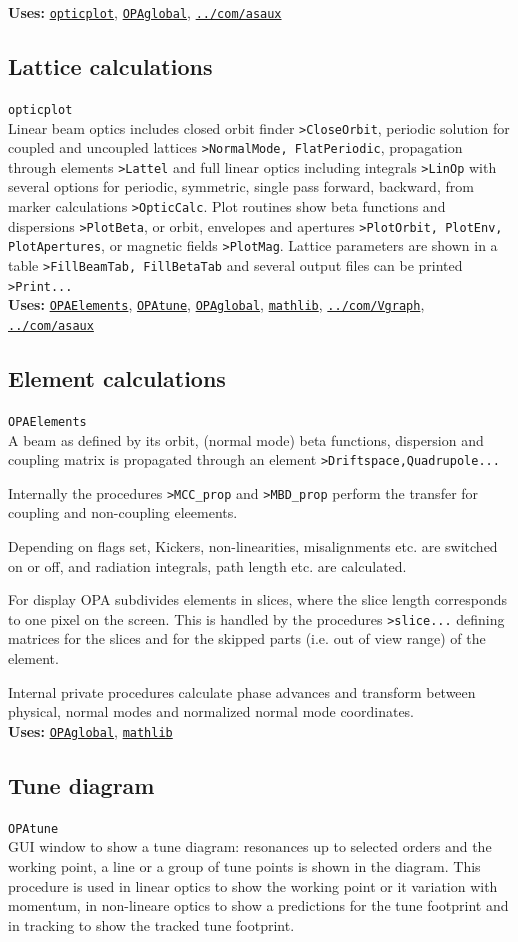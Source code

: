 \documentclass[12pt]{article}
\newcommand\code[1]{{\tt #1}}
\newcommand{\opagui}[1]{\colorbox{blue!20}{\code{#1}}}
\newcommand{\oguih}[2]{\subsection{\label{#2}#1}{\Huge\opagui{#2}}\\}
\newcommand{\ogui}[1]{\hyperref[#1]{\opagui{#1}}}
\newcommand{\opaguif}[1]{\colorbox{violet!30}{\code{#1}}}
\newcommand{\oguif}[1]{\hyperref[#1]{\opaguif{#1}}}
\newcommand{\opauni}[1]{\colorbox{orange!30}{\code{#1}}}
\newcommand{\ounih}[2]{\subsection{\label{#2}#1}{\Huge\opauni{#2}}\\}
\newcommand{\ouni}[1]{\hyperref[#1]{\opauni{#1}}}
\newcommand{\uses}[1]{{\bf Uses: } #1}
\begin{document}
\uses{\ouni{opticplot}, \ouni{OPAglobal}, \ouni{../com/asaux}} 


\ounih{Lattice calculations}{opticplot} 

Linear beam optics includes closed orbit finder \code{>CloseOrbit}, periodic solution for coupled and uncoupled lattices \code{>NormalMode, FlatPeriodic}, propagation through elements \code{>Lattel} and full linear optics including integrals \code{>LinOp} with several options for periodic, symmetric, single pass forward, backward, from marker calculations \code{>OpticCalc}. Plot routines show beta functions and dispersions \code{>PlotBeta}, or orbit, envelopes and apertures \code{>PlotOrbit, PlotEnv, PlotApertures}, or magnetic fields \code{>PlotMag}. Lattice parameters are shown in a table \code{>FillBeamTab, FillBetaTab} and several output files can be printed \code{>Print...}\\



\uses{
 \ouni{OPAElements}, \ogui{OPAtune}, \ouni{OPAglobal}, \ouni{mathlib}, \oguif{../com/Vgraph}, \ouni{../com/asaux}}

\ounih{Element calculations}{OPAElements} 

A beam as defined by its orbit, (normal mode) beta functions, dispersion and coupling matrix is propagated through an element \code{>Driftspace,Quadrupole...}

Internally the procedures \code{>MCC\_prop} and \code{>MBD\_prop} perform the transfer for coupling and non-coupling eleements.

Depending on flags set, Kickers, non-linearities, misalignments etc. are switched on or off,  and radiation integrals, path length etc. are calculated.

For display OPA subdivides elements in slices, where the slice length corresponds to one pixel on the screen. This is handled by the procedures \code{>slice...} defining matrices for the slices and for the skipped parts (i.e. out of view range) of the element.

Internal private procedures calculate phase advances and transform between physical, normal modes and normalized normal mode coordinates.\\

\uses{\ouni{OPAglobal}, \ouni{mathlib}}


\oguih{Tune diagram}{OPAtune}

GUI window to show a tune diagram: resonances up to selected orders and the working point, a line or a group of tune points is shown in the diagram. This procedure is used in linear optics to show the working point or it variation with momentum, in non-lineare optics to show a predictions for the tune footprint and in tracking to show the tracked tune footprint.\\
\end{document}
